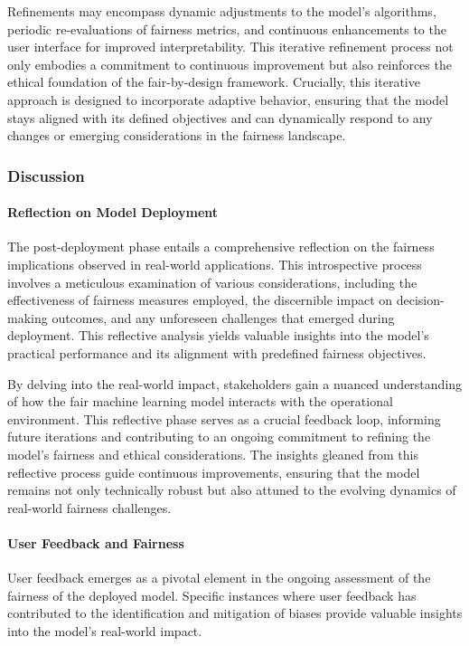 Refinements may encompass dynamic adjustments to the model's algorithms, periodic re-evaluations of fairness metrics, and continuous enhancements to the user interface for improved interpretability. This iterative refinement process not only embodies a commitment to continuous improvement but also reinforces the ethical foundation of the fair-by-design framework. Crucially, this iterative approach is designed to incorporate adaptive behavior, ensuring that the model stays aligned with its defined objectives and can dynamically respond to any changes or emerging considerations in the fairness landscape.

\subsubsection{Discussion}

\paragraph{Reflection on Model Deployment}

The post-deployment phase entails a comprehensive reflection on the fairness implications observed in real-world applications. This introspective process involves a meticulous examination of various considerations, including the effectiveness of fairness measures employed, the discernible impact on decision-making outcomes, and any unforeseen challenges that emerged during deployment. This reflective analysis yields valuable insights into the model's practical performance and its alignment with predefined fairness objectives.

By delving into the real-world impact, stakeholders gain a nuanced understanding of how the fair machine learning model interacts with the operational environment. This reflective phase serves as a crucial feedback loop, informing future iterations and contributing to an ongoing commitment to refining the model's fairness and ethical considerations. The insights gleaned from this reflective process guide continuous improvements, ensuring that the model remains not only technically robust but also attuned to the evolving dynamics of real-world fairness challenges.

\paragraph{User Feedback and Fairness}

User feedback emerges as a pivotal element in the ongoing assessment of the fairness of the deployed model. Specific instances where user feedback has contributed to the identification and mitigation of biases provide valuable insights into the model's real-world impact.


